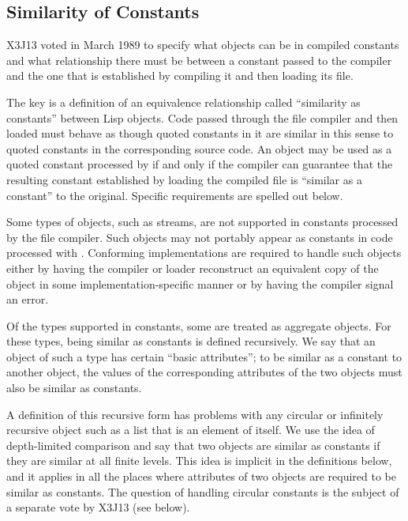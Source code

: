 \subsection{Similarity of Constants}
\label{SIMILAR-AS-A-CONSTANT-SECTION}

X3J13 voted in March 1989 
to specify what objects can be in compiled constants and
what relationship there must be between a constant
passed to the compiler and the one that is established by compiling it
and then loading its file.

The key is a definition of an equivalence relationship called
``similarity as constants''
between Lisp
objects.  Code passed through the file
compiler and then loaded must behave as though quoted constants in it
are similar in this sense to quoted constants in the corresponding source code.
An object may be used as a quoted constant processed by 
if and only if the compiler can guarantee that the resulting constant established
by loading the compiled file is ``similar as a constant'' to the
original.  Specific requirements are spelled out below.

Some types of objects, such as streams, are not supported in constants
processed by the file compiler.  Such objects may not portably appear
as constants in code processed with .  Conforming
implementations are required to handle such objects either by having
the compiler or loader reconstruct an equivalent copy of the
object in some implementation-specific manner or by having the
compiler signal an error.

Of the types supported in constants, some are treated as aggregate
objects.  For these types, being similar as constants is defined
recursively.  We say that an object of such a type has certain ``basic
attributes''; to be similar as a constant to another object, the
values of the corresponding attributes of the two objects must also be
similar as constants.

A definition of this recursive form has problems with any circular or infinitely
recursive object such as a list that is an element of itself.  We use
the idea of depth-limited comparison and say that two objects are
similar as constants if they are similar at all finite levels.  This
idea is implicit in the definitions below, and it applies in all the
places where attributes of two objects are required to be similar as
constants.  The question of handling circular constants is the subject
of a separate vote by X3J13 (see below).

